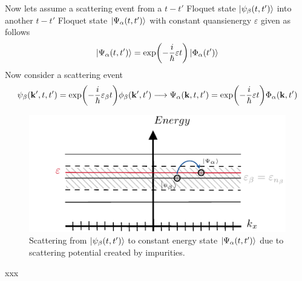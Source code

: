 \vspace{5mm}
\noindent
Now lets assume a scattering event from a $t-t'$ Floquet state $\ket{\psi_{\beta}(t,t')}$ into another $t-t'$ Floquet state $\ket{\Psi_{\alpha}(t,t')}$ with constant quansienergy $\varepsilon$ given as follows
\begin{equation} \label{4.19}
  \ket{\Psi_{\alpha}(t,t')} =
  \exp(-\frac{i}{\hbar}\varepsilon t)
  \ket{\Phi_{\alpha}(t')}
\end{equation}
Now consider a scattering event
\begin{equation} \label{4.20}
  \psi_{\beta}(\mathbf{k'},t,t') = \exp(-\frac{i}{\hbar}\varepsilon_{\beta} t)
  \phi_{\beta}(\mathbf{k'},t')
  \longrightarrow
  \Psi_{\alpha}(\mathbf{k},t,t') = \exp(-\frac{i}{\hbar}\varepsilon t)
  \Phi_{\alpha}(\mathbf{k},t')
\end{equation}
\begin{figure}[ht!]
  \centering
  \includegraphics[scale=1.0]{figures/fig2.pdf}
  \caption{Scattering from $\ket{\psi_{\beta}(t,t')}$ to constant energy state $\ket{\Psi_{\alpha}(t,t')}$ due to scattering potential created by impurities.}
  \label{fig:2}
\end{figure}

























xxx
